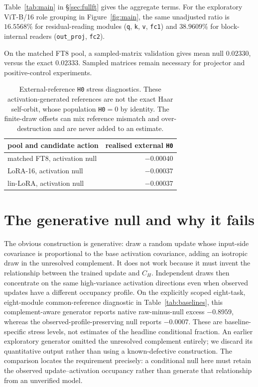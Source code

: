 Table~\ref{tab:main} in \S\ref{sec:fullft} gives the aggregate terms. For the exploratory ViT-B/16 role grouping in Figure~\ref{fig:main}, the same unadjusted ratio is
$16.5568\%$ for residual-reading modules (\texttt{q}, \texttt{k}, \texttt{v}, \texttt{fc1}) and
$38.9609\%$ for block-internal readers (\texttt{out\_proj}, \texttt{fc2}).

On the matched FT8 pool, a sampled-matrix validation gives mean null $0.02330$, versus the exact
$0.02333$. Sampled matrices remain necessary for projector and positive-control experiments.

\begin{table}[h]
\centering
\caption{External-reference \texttt{H0} stress diagnostics. These activation-generated references
are not the exact Haar self-orbit, whose population \texttt{H0}$=0$ by identity. The finite-draw
offsets can mix reference mismatch and over-destruction and are never added to an estimate.}
\begin{tabular}{@{}lr@{}}
\toprule
pool and candidate action & realised external \texttt{H0} \\
\midrule
matched FT8, activation null & $-0.00040$ \\
LoRA-16, activation null & $-0.00037$ \\
lin-LoRA, activation null & $-0.00037$ \\
\bottomrule
\end{tabular}
\end{table}

\section{The generative null and why it fails}
\label{app:generative}

The obvious construction is generative: draw a random update whose input-side covariance is
proportional to the base activation covariance, adding an isotropic draw in the unresolved
complement. It does not work because it must invent the relationship between the trained update
and $C_H$. Independent draws then concentrate on the same high-variance activation directions
even when observed updates have a different occupancy profile. On the explicitly scoped
eight-task, eight-module common-reference diagnostic in Table~\ref{tab:baselines}, this
complement-aware generator reports native raw-minus-null excess $-0.8959$, whereas the
observed-profile-preserving null reports $-0.0007$. These are baseline-specific stress levels,
not estimates of the headline conditional fraction. An earlier exploratory generator omitted
the unresolved complement entirely; we discard its quantitative output rather than using a
known-defective construction. The comparison locates the requirement precisely: a conditional
null here must retain the observed update--activation occupancy rather than generate that
relationship from an unverified model.
